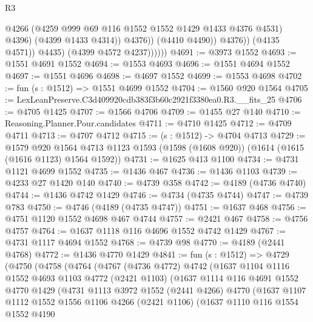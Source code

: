 \begin{lexlean}{R3}
\begin{coremodule}
                                @4266
                                (@4259 @999 @69 @116 @1552 @1552 @1429 @1433 @4376 @4531)
                                @4396)
                              (@4399 @1433 @4314))
                            @4376))
                        (@4410 @4490))
                      @4376))
                  (@4135 @4571))
                @4435)
              (@4399 @4572 @4237))))))
@4691 := @3973 @1552
@4693 := @1551 @4691 @1552
@4694 := @1553 @4693
@4696 := @1551 @4694 @1552
@4697 := @1551 @4696
@4698 := @4697 @1552
@4699 := @1553 @4698
@4702 := fun (s : @1512) => @1551 @4699 @1552
@4704 := @1560 @920 @1564
@4705 := LexLeanPreserve.C3d409920cdb383f3b60c2921f3380ea0.R3.__fits_25
@4706 := @4705 @1425
@4707 := @1566 @4706
@4709 := @1455 @27 @140
@4710 := Reasoning.Planner.Pour.candidates
@4711 := @4710 @1425
@4712 := @4709 @4711
@4713 := @4707 @4712
@4715 := (s : @1512) -> @4704 @4713
@4729 := @1579
    @920
    @1564
    @4713
    @1123
    @1593
    (@1598 (@1608 @920))
    (@1614 (@1615 (@1616 @1123) @1564 @1592))
@4731 := @1625 @413 @1100
@4734 := @4731 @1121 @4699 @1552
@4735 := @1436 @467
@4736 := @1436 @1103
@4739 := @4233 @27 @1420 @140
@4740 := @4739 @358
@4742 := @4189 (@4736 @4740)
@4744 := @1436 @4742 @1429
@4746 := @4734 (@4735 @4744)
@4747 := @4739 @783
@4750 := @4746 (@4189 (@4735 @4747))
@4751 := @1637 @468
@4756 := @4751 @1120 @1552 @4698 @467 @4744
@4757 := @2421 @467
@4758 := @4756 @4757
@4764 := @1637 @1118 @116 @4696 @1552 @4742 @1429
@4767 := @4731 @1117 @4694 @1552
@4768 := @4739 @98
@4770 := @4189 (@2441 @4768)
@4772 := @1436 @4770 @1429
@4841 := fun (s : @1512) =>
  @4729
    (@4750
      (@4758
        (@4764
          (@4767
            (@4736 @4772)
            @4742
            (@1637
              @1104
              @1116
              @1552
              @4693
              @1103
              @4772
              (@2421 @1103)
              (@1637
                @1114
                @116
                @4691
                @1552
                @4770
                @1429
                (@4731
                  @1113
                  @3972
                  @1552
                  (@2441 @4266)
                  @4770
                  (@1637
                    @1107
                    @1112
                    @1552
                    @1556
                    @1106
                    @4266
                    (@2421 @1106)
                    (@1637
                      @1110
                      @116
                      @1554
                      @1552
                      @4190

\end{coremodule}
\end{lexlean}
